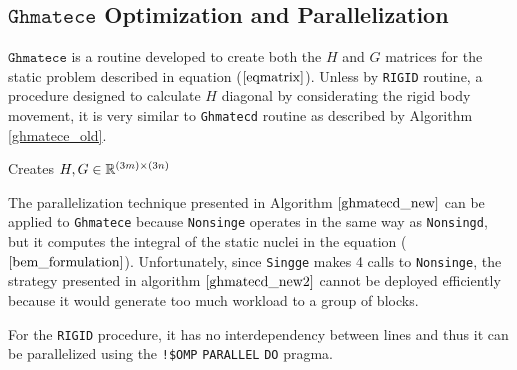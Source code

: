 \subsection{$\texttt{Ghmatece}$ Optimization and Parallelization}

$\texttt{Ghmatece}$ is a routine developed to create both the $H$ and $G$ matrices for the static problem described in equation ($\ref{eqmatrix}$). 
Unless by \texttt{RIGID} routine, a procedure designed to calculate $H$ diagonal by considerating the rigid body movement, 
it is very similar to \texttt{Ghmatecd} routine as described by Algorithm \ref{ghmatece_old}. 

\begin{algorithm}[H]
\caption{Creates $H, G \in \mathbb{R}^{(3m)\times(3n)}$}
\label{ghmatece_old}
\begin{algorithmic}[1]
				\Else
				\EndIf
			\EndFor
		\EndFor 
	\EndProcedure

				\EndIf
			\EndFor
		\EndFor
		\EndProcedure
\end{algorithmic}
\end{algorithm}

The parallelization technique presented in Algorithm $\ref{ghmatecd_new}$ can be applied to \texttt{Ghmatece} 
because \texttt{Nonsinge} operates in the same way as \texttt{Nonsingd}, but it computes the integral 
of the static nuclei in the equation ($\ref{bem_formulation}$). Unfortunately, since 
\texttt{Singge} makes 4 calls to \texttt{Nonsinge}, the strategy presented in 
algorithm $\ref{ghmatecd_new2}$ cannot be deployed efficiently because it would 
generate too much workload to a group of blocks.

For the \texttt{RIGID} procedure, it has no interdependency between lines and thus it can be parallelized using the 
\texttt{!\$OMP} \texttt{PARALLEL} \texttt{DO} pragma.

